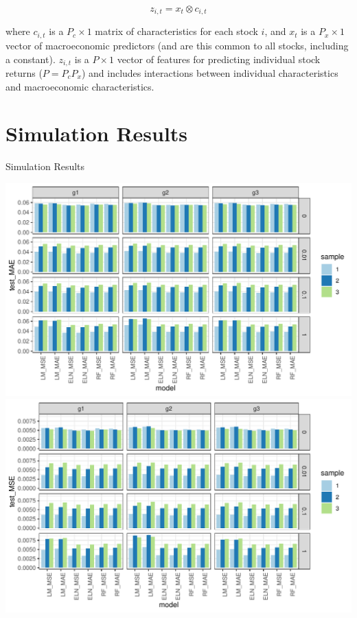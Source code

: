 \documentclass[a4paper, table]{article}
\begin{document}
\begin{equation}
\label{kronecker_equation}
	z_{i,t} = x_t \otimes c_{i,t}
\end{equation}

where \( c_{i,t} \) is a \( P_c \times 1 \) matrix of characteristics for each stock \(i\), and \(x_t\) is a $P_x \times 1$ vector of macroeconomic predictors (and are this common to all stocks, including a constant). $z_{i,t}$ is a $P \times 1$ vector of features for predicting individual stock returns ($P = P_cP_x$) and includes interactions between individual characteristics and macroeconomic characteristics. 

\section{Simulation Results}

\begin{table}
	\caption{Simulation Results}
	\begin{center}
		\includegraphics{simulation_test_mae.pdf}
		\includegraphics{simulation_test_mse.pdf}
	\end{center}
\end{table}
\end{document}
